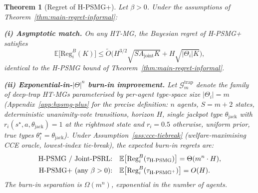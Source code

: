 \documentclass{article}
\newtheorem{theorem}{Theorem}[section]
\def\textsuperscript#1{#1}%
\begin{document}
\begin{theorem}[Regret of H-PSMG\textsuperscript{+}]
\label{thm:hpsmg-plus}
Let $\beta > 0$. Under the assumptions of Theorem~\ref{thm:main-regret-informal}:

\textbf{(i) Asymptotic match.} On any HT-MG, the Bayesian regret of H-PSMG\textsuperscript{+} satisfies
\begin{equation}
\mathbb{E}\big[\mathrm{Reg}_i^B(K)\big] \leq \tilde{O}\big(H^{3/2}\sqrt{S A_{\mathrm{joint}} K} + H\sqrt{|\Theta_i| K}\big),
\end{equation}
identical to the H-PSMG bound of Theorem~\ref{thm:main-regret-informal}.

\textbf{(ii) Exponential-in-$|\Theta|^n$ burn-in improvement.} Let $\mathcal{G}_m^{\mathrm{trap}}$ denote the family of deep-trap HT-MGs parameterised by per-agent type-space size $|\Theta_i| = m$ (Appendix~\ref{app:hpsmg-plus} for the precise definition: $n$ agents, $S = m+2$ states, deterministic unanimity-vote transitions, horizon $H$, single jackpot type $\theta_{\mathrm{jack}}$ with $r_i(s^\star, a, \theta_{\mathrm{jack}}) = 1$ at the rightmost state and $r_i = 0.5$ otherwise, uniform prior, true types $\theta_i^\star = \theta_{\mathrm{jack}}$). Under Assumption~\ref{ass:cce-tiebreak} (welfare-maximising CCE oracle, lowest-index tie-break), the expected burn-in regrets are:
\begin{align}
\textnormal{H-PSMG / Joint-PSRL:} \quad &\mathbb{E}\big[\mathrm{Reg}_i^B(\tau_{\textnormal{H-PSMG}})\big] = \Theta(m^n \cdot H), \\
\textnormal{H-PSMG\textsuperscript{+} (any } \beta > 0\textnormal{):} \quad &\mathbb{E}\big[\mathrm{Reg}_i^B(\tau_{\textnormal{H-PSMG}^+})\big] = O(H).
\end{align}
The burn-in separation is $\Omega(m^n)$, exponential in the number of agents.
\end{theorem}
\end{document}
